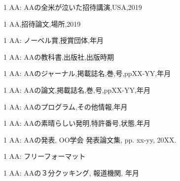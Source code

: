 \begin{招待講演}{1}
AA:
AAの全米が泣いた招待講演,USA,2019
\end{招待講演}

\begin{招待論文}{1}
AA,招待論文,場所,2019
\end{招待論文}


\begin{受賞}{1}
AA:
ノーベル賞,授賞団体,年月
\end{受賞}

\begin{著書}{1}
AA:
AAの教科書,出版社,出版時期
\end{著書}

\begin{雑誌論文}{1}
AA:
AAのジャーナル,掲載誌名,巻,号,ppXX-YY,年月
\end{雑誌論文}

\begin{査読付}{1}
AA:
AAの論文,掲載誌名,巻,号,ppXX-YY,年月
\end{査読付}

\begin{公開}{1}
AA:
AAのプログラム,その他情報,年月
\end{公開}

\begin{特許}{1}
AA:
AAの素晴らしい発明,特許番号,状態,年月
\end{特許}

\begin{発表}{1}
 AA:
 AAの発表,  OO学会 発表論文集, pp. xx-yy, 20XX.
\end{発表}

\begin{特記}{1}
AA:
フリーフォーマット
\end{特記}

\begin{報道}{1}
AA:
AAの３分クッキング, 報道機関, 年月
\end{報道}
